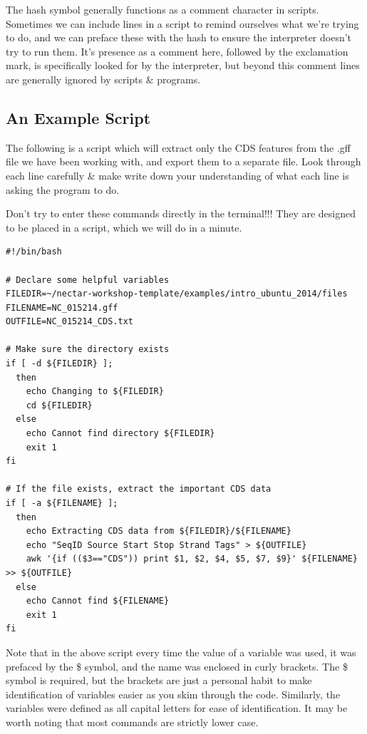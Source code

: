 \documentclass[a4paper,12pt,twoside]{memoir}
\begin{document}
\begin{note}
The hash symbol generally functions as a comment character in scripts.
Sometimes we can include lines in a script to remind ourselves what we're trying to do, and we can preface these with the hash to ensure the interpreter doesn't try to run them.
It's presence as a comment here, followed by the exclamation mark, is specifically looked for by the interpreter, but beyond this comment lines are generally ignored by scripts \& programs.
\end{note}

\subsection{An Example Script}
The following is a script which will extract only the CDS features from the .gff file we have been working with, and export them to a separate file.
Look through each line carefully \& make write down your understanding of what each line is asking the program to do.

\begin{warning}
Don't try to enter these commands directly in the terminal!!!
They are designed to be placed in a script, which we will do in a minute.
\end{warning}

\begin{lstlisting}
#!/bin/bash

# Declare some helpful variables
FILEDIR=~/nectar-workshop-template/examples/intro_ubuntu_2014/files
FILENAME=NC_015214.gff
OUTFILE=NC_015214_CDS.txt

# Make sure the directory exists
if [ -d ${FILEDIR} ];
  then
    echo Changing to ${FILEDIR}
    cd ${FILEDIR}
  else
    echo Cannot find directory ${FILEDIR}
    exit 1
fi

# If the file exists, extract the important CDS data
if [ -a ${FILENAME} ];
  then
    echo Extracting CDS data from ${FILEDIR}/${FILENAME}
    echo "SeqID Source Start Stop Strand Tags" > ${OUTFILE}
    awk '{if (($3=="CDS")) print $1, $2, $4, $5, $7, $9}' ${FILENAME} >> ${OUTFILE}
  else
    echo Cannot find ${FILENAME}
    exit 1
fi
\end{lstlisting}

\begin{information}
Note that in the above script every time the value of a variable was used, it was prefaced by the \$ symbol, and the name was enclosed in curly brackets.
The \$ symbol is required, but the brackets are just a personal habit to make identification of variables easier as you skim through the code.
Similarly, the variables were defined as all capital letters for ease of identification.
It may be worth noting that most commands are strictly lower case.
\end{information}
\end{document}
